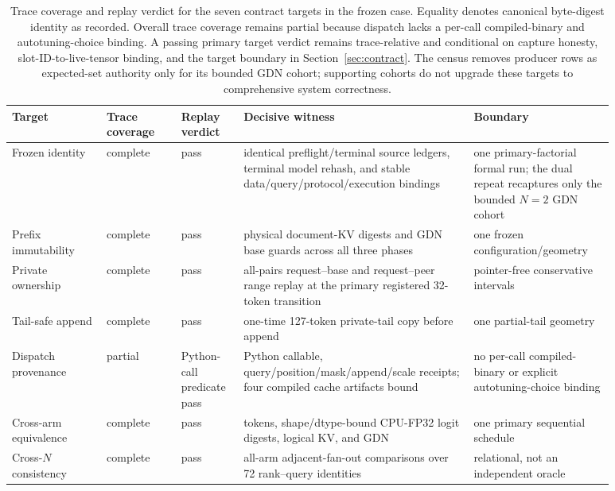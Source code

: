 \documentclass{article}
\begin{document}
\begin{table}[H]
  \caption{Trace coverage and replay verdict for the seven contract targets in
  the frozen case.  Equality denotes canonical byte-digest identity as
  recorded.  Overall trace coverage remains partial because dispatch lacks a
  per-call compiled-binary and autotuning-choice binding.  A passing primary
  target verdict remains trace-relative and conditional on capture honesty,
  slot-ID-to-live-tensor binding, and the target boundary in Section~\ref{sec:contract}.
  The census removes producer rows as expected-set authority only for its bounded
  GDN cohort; supporting cohorts do not upgrade these targets to comprehensive
  system correctness.}
  \label{tab:witness}
  \centering
  \scriptsize
  \begin{tabular}{@{}>{\raggedright\arraybackslash}p{0.14\linewidth}p{0.11\linewidth}p{0.09\linewidth}>{\raggedright\arraybackslash}p{0.34\linewidth}>{\raggedright\arraybackslash}p{0.20\linewidth}@{}}
    \toprule
    Target & Trace coverage & Replay verdict & Decisive witness & Boundary \\
    \midrule
    Frozen identity & complete & pass & identical preflight/terminal source ledgers, terminal model rehash, and stable data/query/protocol/execution bindings & one primary-factorial formal run; the dual repeat recaptures only the bounded $N=2$ GDN cohort \\
    Prefix immutability & complete & pass & physical document-KV digests and GDN base guards across all three phases & one frozen configuration/geometry \\
    Private ownership & complete & pass & all-pairs request--base and request--peer range replay at the primary registered 32-token transition & pointer-free conservative intervals \\
    Tail-safe append & complete & pass & one-time 127-token private-tail copy before append & one partial-tail geometry \\
    Dispatch provenance & partial & Python-call predicate pass & Python callable, query/position/mask/append/scale receipts; four compiled cache artifacts bound & no per-call compiled-binary or explicit autotuning-choice binding \\
    Cross-arm equivalence & complete & pass & tokens, shape/dtype-bound CPU-FP32 logit digests, logical KV, and GDN & one primary sequential schedule \\
    Cross-$N$ consistency & complete & pass & 288 all-arm adjacent-fan-out comparisons over 72 rank--query identities & relational, not an independent oracle \\
    \bottomrule
  \end{tabular}
\end{table}
\end{document}
